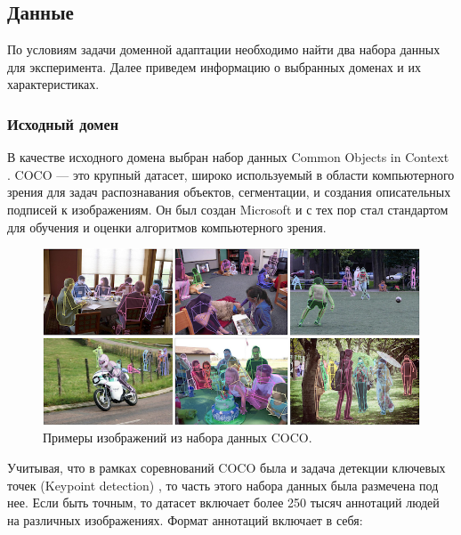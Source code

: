 \subsection{Данные}

По условиям задачи доменной адаптации необходимо найти два набора данных для эксперимента. Далее приведем информацию о выбранных доменах и их характеристиках.

\subsubsection*{Исходный домен}

В качестве исходного домена выбран набор данных Common Objects in Context \cite{COCO_dataset}. COCO — это крупный датасет, широко используемый в области компьютерного зрения для задач распознавания объектов, сегментации, и создания описательных подписей к изображениям. Он был создан Microsoft и с тех пор стал стандартом для обучения и оценки алгоритмов компьютерного зрения.

\begin{figure}[h]
	\centering
	\includegraphics[width=\textwidth]{./images/experiment/coco_dataset}
	\caption{Примеры изображений из набора данных COCO. \cite{COCO_topology}}
	\label{fig:coco_dataset}
\end{figure}

Учитывая, что в рамках соревнований COCO была и задача детекции ключевых точек (Keypoint detection) \cite{COCO_topology}, то часть этого набора данных была размечена под нее. Если быть точным, то датасет включает более 250 тысяч аннотаций людей на различных изображениях. Формат аннотаций включает в себя:

